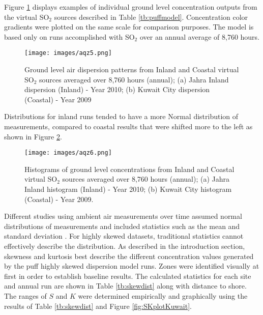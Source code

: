 Figure \ref{fig:virtual-dispersions} displays examples of individual ground level concentration outputs from the virtual SO$_{2}$ sources described in Table \ref{tb:puffmodel}. Concentration color gradients were plotted on the same scale for comparison purposes.  The model is based only on runs accomplished with SO$_{2}$ over an annual average of 8,760 hours.  
%
\begin{figure}[H]
\texttt{[image: images/aqz5.png]} 
\caption[Ground level air dispersion patterns]{Ground level air dispersion patterns from Inland and Coastal virtual SO$_{2}$ sources averaged over 8,760 hours (annual); (a) Jahra Inland dispersion (Inland) - Year 2010; (b) Kuwait City dispersion (Coastal) - Year 2009}
\label{fig:virtual-dispersions}
\end{figure}
%
Distributions for inland runs tended to have a more Normal distribution of measurements, compared to coastal results that were shifted more to the left as shown in Figure \ref{fig:virtual-histogram}.
%
\begin{figure}[H]
\texttt{[image: images/aqz6.png]} 
\caption[Histograms of ground level concentrations]{Histograms of ground level concentrations from Inland and Coastal virtual SO$_{2}$ sources averaged over 8,760 hours (annual); (a) Jahra Inland histogram (Inland) - Year 2010; (b) Kuwait City histogram (Coastal) - Year 2009.}
\label{fig:virtual-histogram}
\end{figure}
%

Different studies using ambient air measurements over time assumed normal distributions of measurements and included statistics such as the mean and standard deviation \citep{Henschel2013, Rivera2015, Suresh2005}.  For highly skewed datasets, traditional statistics cannot effectively describe the distribution.  As described in the introduction section, skewness and kurtosis best describe the different concentration values generated by the puff highly skewed dispersion model runs.  Zones were identified visually at first in order to establish baseline results.  The calculated statistics for each site and annual run are shown in Table \ref{tb:skewdist} along with distance to shore.  The ranges of $S$ and $K$ were determined empirically and graphically using the results of Table \ref{tb:skewdist} and Figure  \ref{fig:SKplotKuwait}.

